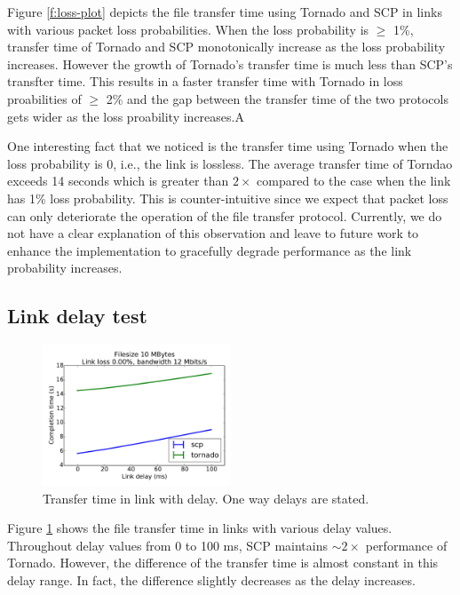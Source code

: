 \documentclass{sig-alternate-10pt}
\begin{document}
Figure \ref{f:loss-plot} depicts the file transfer time using Tornado and SCP in
links with various packet loss probabilities. When the loss probability is
$\geq$ 1\%, transfer time of Tornado and SCP monotonically increase as the loss
probability increases. However the growth of Tornado's transfer time is much
less than SCP's transfter time. This results in a faster transfer time with
Tornado in loss proabilities of $\geq$ 2\% and the gap between the transfer time
of the two protocols gets wider as the loss proability increases.A

One interesting fact that we noticed is the transfer time using Tornado when
the loss probability is 0, i.e., the link is lossless. The average transfer time of
Torndao exceeds 14 seconds which is greater than $2\times$ compared to the case
when the link has 1\% loss probability. This is counter-intuitive since we
expect that packet loss can only deteriorate the operation of the file transfer
protocol. Currently, we do not have a clear explanation of this observation and
leave to future work to enhance the implementation to gracefully degrade
performance as the link probability increases.


\subsection{Link delay test}

\begin{figure}[t]
  \centering
  \includegraphics[width=0.5\textwidth]{delay-plot}
  \caption{Transfer time in link with delay. One way delays are stated.}
  \label{f:delay-plot}
\end{figure}

Figure \ref{f:delay-plot} shows the file transfer time in links with various
delay values. Throughout delay values from 0 to 100 ms, SCP maintains $\sim
2\times$ performance of Tornado. However, the difference of the transfer time is
almost constant in this delay range. In fact, the difference slightly decreases
as the delay increases. 
\end{document}
